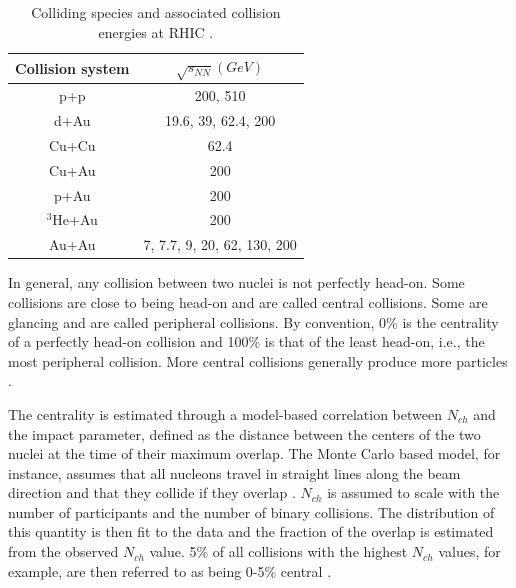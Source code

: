 \begin{table}[h!]
\centering
\begin{tabular}{||c c||}
\hline
Collision system & $\sqrt{s_{NN}}(GeV)$ \\ [0.5ex]
\hline
\hline
p+p & 200, 510 \\
d+Au & 19.6, 39, 62.4, 200 \\
Cu+Cu & 62.4 \\
Cu+Au &  200 \\
p+Au & 200 \\
$^3$He+Au & 200 \\
Au+Au & 7, 7.7, 9, 20, 62, 130, 200 \\ [1ex]
\hline
\end{tabular}
\caption{Colliding species and associated collision energies at RHIC \cite{phdthesisnattrass}.}
\label{table:RHIC_specs}
\end{table}


In general, any collision between two nuclei is not perfectly head-on. Some collisions are close to being head-on and are called central collisions. Some are glancing and are called peripheral collisions. %
By convention, 0\% is the centrality of a perfectly head-on collision and 100\% is that of the least head-on, i.e., the most peripheral collision. More central collisions generally produce more particles \cite{Connors:2017ptx}.

The centrality is estimated through a model-based correlation between $N_{ch}$ and the impact parameter, defined as the distance between the centers of the two nuclei at the time of their maximum overlap. The Monte Carlo based model, for instance, assumes that all nucleons travel in straight lines along the beam direction \cite{Loizides:2014vua} and that they collide if they overlap \cite{Miller:2007ri}. $N_{ch}$ is assumed to scale with the number of participants and the number of binary collisions. The distribution of this quantity is then fit to the data and the fraction of the overlap is estimated from the observed $N_{ch}$ value. 5\% of all collisions with the highest $N_{ch}$ values, for example, are then referred to as being 0-5\% central \cite{Connors:2017ptx}.

